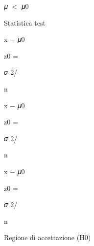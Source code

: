 \documentclass[a4paper,portrait,12pt]{article}
\begin{document}
\begin{flushleft}
𝜇 $<$ 𝜇0
\end{flushleft}





\begin{flushleft}
Statistica test
\end{flushleft}


\begin{flushleft}
x $-$ 𝜇0
\end{flushleft}


\begin{flushleft}
z0 =
\end{flushleft}


\begin{flushleft}
𝜎 2/
\end{flushleft}


\begin{flushleft}
n
\end{flushleft}


\begin{flushleft}
x $-$ 𝜇0
\end{flushleft}


\begin{flushleft}
z0 =
\end{flushleft}


\begin{flushleft}
𝜎 2/
\end{flushleft}


\begin{flushleft}
n
\end{flushleft}


\begin{flushleft}
x $-$ 𝜇0
\end{flushleft}


\begin{flushleft}
z0 =
\end{flushleft}


\begin{flushleft}
𝜎 2/
\end{flushleft}


\begin{flushleft}
n
\end{flushleft}





\begin{flushleft}
Regione di accettazione (H0)
\end{flushleft}
\end{document}
